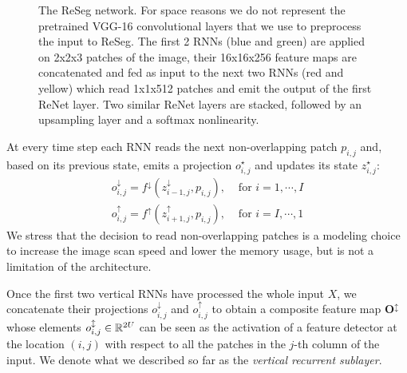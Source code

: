\begin{figure}[t]
    \advance{}\textwidth
    \centering
    \caption{The ReSeg network. For space reasons we do not represent the
        pretrained VGG-16 convolutional layers that we use to preprocess
        the input to ReSeg. The first 2 RNNs (blue and green) are applied on
        2x2x3 patches of the image, their 16x16x256 feature maps are
        concatenated and fed as input to the next two RNNs (red and yellow)
        which read 1x1x512 patches and emit the output of the first ReNet
        layer. Two similar ReNet layers are stacked, followed by an upsampling
        layer and a softmax nonlinearity.}
    \label{fig:ReSeg}
\end{figure}

At every time step each RNN reads the next non-overlapping patch
$p_{i,j}$ and, based on its previous
state, emits a projection $o_{i,j}^{\star}$ and updates its state
$z_{i,j}^{\star}$:
\begin{align}
    o^{\downarrow}_{i,j} = f^{\downarrow}(z^{\downarrow}_{i-1,j},p_{i,j}),
        &\text{ for }i=1,\cdots, I\\
    o^{\uparrow}_{i,j} = f^{\uparrow}(z^{\uparrow}_{i+1,j},p_{i,j}),
        &\text{ for }i=I,\cdots,1
\end{align}
We stress that the decision to read non-overlapping patches is a modeling
choice to increase the image scan speed and lower the memory usage, but is not
a limitation of the architecture.

Once the first two vertical RNNs have processed the whole input $X$, we
concatenate their projections $o^{\downarrow}_{i,j}$ and $o^{\uparrow}_{i,j}$
to obtain a composite feature map $\mathbf{O^{\updownarrow}}$ whose elements
$o^{\updownarrow}_{i,j} \in \mathbb{R}^{2U}$ can be seen as the activation of a
feature detector at the location $(i,j)$ with respect to all the patches in the
$j$-th column of the input. We denote what we described so far as the
\emph{vertical recurrent sublayer}.

